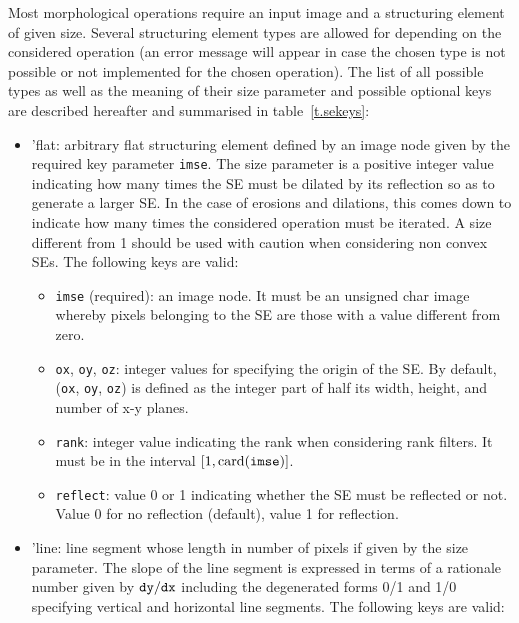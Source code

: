 \documentclass{book}
\renewcommand{\SE}{{SE}}
\newcommand{\imsekey}{\mbox{\tt imse}}
\newcommand{\oxkey}{\mbox{\tt ox}}
\newcommand{\oykey}{\mbox{\tt oy}}
\newcommand{\ozkey}{\mbox{\tt oz}}
\newcommand{\rankkey}{\mbox{\tt rank}}
\newcommand{\reflectkey}{\mbox{\tt reflect}}
\newcommand{\dxkey}{\mbox{\tt dx}}
\newcommand{\dykey}{\mbox{\tt dy}}
\begin{document}
Most morphological operations require an input image and a structuring element of given size.  Several structuring element types are allowed for depending on the considered operation (an error message will appear in case the chosen type is not possible or not implemented for the chosen operation).  The list of all possible types as well as the meaning of their size parameter and possible optional keys are described hereafter and summarised in table~\ref{t.sekeys}:
\begin{itemize}

\item 'flat: arbitrary flat structuring element defined by an image node given by the required key parameter {\imsekey}.  The size parameter is a positive integer value indicating how many times the {\SE} must be dilated by its reflection so as to generate a larger {\SE}.  In the case of erosions and dilations, this comes down to indicate how many times the considered operation must be iterated.  A size different from 1 should be used with caution when considering non convex {\SE}s.  The following keys are valid:

\begin{itemize}
\item {\imsekey} (required): an image node.  It must be an unsigned char image whereby pixels belonging to the {\SE} are those with a value different from zero.  
\item \oxkey, \oykey, \ozkey: integer values for specifying the origin of the {\SE}.  By default,  (\oxkey, \oykey, \ozkey) is defined as the integer part of half its width, height, and number of x-y planes.
\item \rankkey: integer value indicating the rank when considering rank filters. It must be in the interval $[1,\card{\imsekey}]$.
\item \reflectkey:  value 0 or 1 indicating whether the {\SE} must be reflected or not.  Value 0 for no reflection (default), value 1 for reflection.
\end{itemize}


\item 'line: line segment whose length in number of pixels if given by the size parameter.  The slope of the line segment is expressed in terms of a rationale number  given by $\dykey/\dxkey$ including the degenerated forms 0/1 and 1/0 specifying vertical and horizontal line segments.  The following keys are valid:


\end{itemize}
\end{document}
